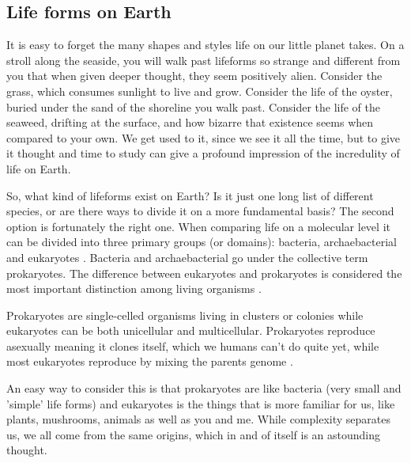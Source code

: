 \subsection*{Life forms on Earth}

It is easy to forget the many shapes and styles life on our little planet takes. On a stroll along the seaside, you will walk past lifeforms so strange and different from you that when given deeper thought, they seem positively alien.
Consider the grass, which consumes sunlight to live and grow. Consider the life of the oyster, buried under the sand of the shoreline you walk past.
Consider the life of the seaweed, drifting at the surface, and how bizarre that existence seems when compared to your own.
We get used to it, since we see it all the time, but to give it thought and time to study can give a profound impression of the incredulity of life on Earth.

So, what kind of lifeforms exist on Earth?
Is it just one long list of different species, or are there ways to divide it on a more fundamental basis?
The second option is fortunately the right one.
When comparing life on a molecular level it can be divided into three primary groups (or domains): bacteria, archaebacterial and eukaryotes \cite{Eukaryotes}.
Bacteria and archaebacterial go under the collective term prokaryotes.
The difference between eukaryotes and prokaryotes is considered the most important distinction among living organisms \cite{Procaryotes}.

Prokaryotes are single-celled organisms living in clusters or colonies while eukaryotes can be both unicellular and multicellular.
Prokaryotes reproduce asexually meaning it clones itself, which we humans can't do quite yet, while most eukaryotes reproduce by mixing the parents genome \cite{ProcaEuka}. 

An easy way to consider this is that prokaryotes are like bacteria (very small and 'simple' life forms) and eukaryotes is the things that is more familiar for us, like plants, mushrooms, animals as well as you and me.
While complexity separates us, we all come from the same origins, which in and of itself is an astounding thought.

